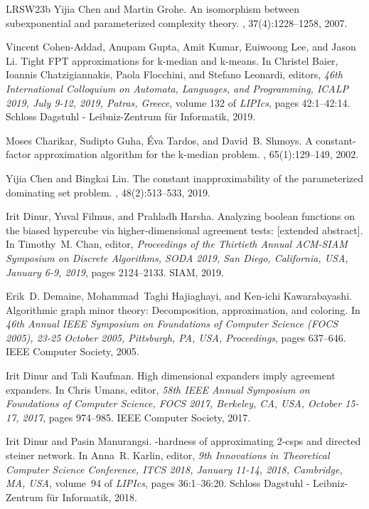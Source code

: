 \documentclass[10pt,a4paper]{article}
\begin{document}
\begin{thebibliography}{LRSW23b}
Yijia Chen and Martin Grohe.
\newblock An isomorphism between subexponential and parameterized complexity
  theory.
, 37(4):1228--1258, 2007.

Vincent Cohen{-}Addad, Anupam Gupta, Amit Kumar, Euiwoong Lee, and Jason Li.
\newblock Tight {FPT} approximations for k-median and k-means.
\newblock In Christel Baier, Ioannis Chatzigiannakis, Paola Flocchini, and
  Stefano Leonardi, editors, {\em 46th International Colloquium on Automata,
  Languages, and Programming, {ICALP} 2019, July 9-12, 2019, Patras, Greece},
  volume 132 of {\em LIPIcs}, pages 42:1--42:14. Schloss Dagstuhl -
  Leibniz-Zentrum f{\"{u}}r Informatik, 2019.

Moses Charikar, Sudipto Guha, {\'{E}}va Tardos, and David~B. Shmoys.
\newblock A constant-factor approximation algorithm for the k-median problem.
, 65(1):129--149, 2002.

Yijia Chen and Bingkai Lin.
\newblock The constant inapproximability of the parameterized dominating set
  problem.
, 48(2):513--533, 2019.

Irit Dinur, Yuval Filmus, and Prahladh Harsha.
\newblock Analyzing boolean functions on the biased hypercube via
  higher-dimensional agreement tests: [extended abstract].
\newblock In Timothy~M. Chan, editor, {\em Proceedings of the Thirtieth Annual
  {ACM-SIAM} Symposium on Discrete Algorithms, {SODA} 2019, San Diego,
  California, USA, January 6-9, 2019}, pages 2124--2133. {SIAM}, 2019.

Erik~D. Demaine, Mohammad~Taghi Hajiaghayi, and Ken{-}ichi Kawarabayashi.
\newblock Algorithmic graph minor theory: Decomposition, approximation, and
  coloring.
\newblock In {\em 46th Annual {IEEE} Symposium on Foundations of Computer
  Science {(FOCS} 2005), 23-25 October 2005, Pittsburgh, PA, USA, Proceedings},
  pages 637--646. {IEEE} Computer Society, 2005.

Irit Dinur and Tali Kaufman.
\newblock High dimensional expanders imply agreement expanders.
\newblock In Chris Umans, editor, {\em 58th {IEEE} Annual Symposium on
  Foundations of Computer Science, {FOCS} 2017, Berkeley, CA, USA, October
  15-17, 2017}, pages 974--985. {IEEE} Computer Society, 2017.

Irit Dinur and Pasin Manurangsi.
-hardness of approximating 2-csps and directed steiner network.
\newblock In Anna~R. Karlin, editor, {\em 9th Innovations in Theoretical
  Computer Science Conference, {ITCS} 2018, January 11-14, 2018, Cambridge, MA,
  {USA}}, volume~94 of {\em LIPIcs}, pages 36:1--36:20. Schloss Dagstuhl -
  Leibniz-Zentrum f{\"{u}}r Informatik, 2018.


\end{thebibliography}
\end{document}
